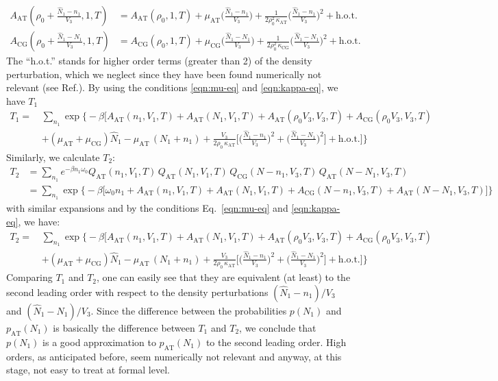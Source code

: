 \documentclass[aip,jcp,a4paper,reprint,onecolumn]{revtex4-1}
\newcommand{\AT}{{\textrm{{AT}}}}
\newcommand{\CG}{{\textrm{CG}}}
\begin{document}
\begin{align}
  A_{\AT}(\rho_0 + \frac{\hat N_1 - n_1}{V_3},1,T)
  &= A_{\AT}(\rho_0,1,T)
  +\mu_{\AT}
  \Big(
  \frac{\hat N_1 - n_1}{V_3}
  \Big)
  +
  \frac1{2\rho_0^2\,\kappa_{\AT}}
  \Big(
  \frac{\hat N_1 - n_1}{V_3}
  \Big)^2
  + \textrm{h.o.t.} \\
  A_{\CG}(\rho_0 + \frac{\hat N_1 - N_1}{V_3},1,T)
  &= A_{\CG}(\rho_0,1,T)
  +\mu_{\CG}
  \Big(
  \frac{\hat N_1 - N_1}{V_3}
  \Big)
  +
  \frac1{2\rho_0^2\,\kappa_{\CG}}
  \Big(
  \frac{\hat N_1 - N_1}{V_3}
  \Big)^2
  + \textrm{h.o.t.} 
\end{align}
The ``h.o.t.'' stands for higher order terms (greater than 2)
of the density perturbation, which we neglect since they have been found numerically not relevant (see Ref.\cite{rdfcorr}).
By using the conditions \eqref{eqn:mu-eq} and \eqref{eqn:kappa-eq},
we have $T_1$
\begin{align}\nonumber
  T_1
  = \,&
  \sum_{n_1}
  \exp
  \Big\{-\beta
  \Big[
  A_{\AT}(n_1,V_1,T) +
  A_{\AT}(N_1,V_1,T) +
  A_{\AT}(\rho_0V_3,V_3,T) +
  A_{\CG}(\rho_0V_3,V_3,T) \\
  \,&+(\mu_\AT + \mu_\CG)\hat N_1
  -\mu_{\AT}\,(N_1 + n_1) +
  \frac{V_3}{2\rho_0\, \kappa_{\AT}}
  \Big[
  \Big(
  \frac{\hat N_1 - n_1}{V_3}
  \Big)^2
  +
  \Big(
  \frac{\hat N_1 - N_1}{V_3}
  \Big)^2
  \Big]
  +\textrm{h.o.t.}
  \Big]
  \Big\}
\end{align}
Similarly, we calculate $T_2$:
\begin{align}\nonumber
  T_2
  &=
  \sum_{n_1}
  e^{-\beta n_1\omega_0}
  Q_{\AT}(n_1,V_1,T)\,
  Q_{\AT}(N_1,V_1,T)\,
  Q_{\CG}(N-n_1,V_3,T)\,
  Q_{\AT}(N-N_1,V_3,T) \\\nonumber
  &=
  \sum_{n_1}
  \exp
  \big\{-\beta
  \big[
  \omega_0n_1 +
  A_{\AT}(n_1,V_1,T) +
  A_{\AT}(N_1,V_1,T) +
  A_{\CG}(N-n_1,V_3,T) +
  A_{\AT}(N-N_1,V_3,T)
  \big]
  \big\}
\end{align}
with similar expansions and by the conditions Eq.~\eqref{eqn:mu-eq}
and \eqref{eqn:kappa-eq}, we have:
\begin{align}\nonumber
  T_2
  = \,&
  \sum_{n_1}
  \exp
  \Big\{-\beta
  \Big[
  A_{\AT}(n_1,V_1,T) +
  A_{\AT}(N_1,V_1,T) +
  A_{\AT}(\rho_0V_3,V_3,T) +
  A_{\CG}(\rho_0V_3,V_3,T) \\
  \,&+(\mu_\AT + \mu_\CG)\hat N_1
  -\mu_{\AT}\,(N_1 + n_1) +
  \frac{V_3}{2\rho_0\, \kappa_{\AT}}
  \Big[
  \Big(
  \frac{\hat N_1 - n_1}{V_3}
  \Big)^2
  +
  \Big(
  \frac{\hat N_1 - N_1}{V_3}
  \Big)^2
  \Big]
  +\textrm{h.o.t.}
  \Big]
  \Big\}
\end{align}
Comparing $T_1$ and $T_2$, one can easily see that they are equivalent (at least) to the second leading
order with respect to the density perturbations
$(\hat N_1 - n_1)/{V_3}$
and $(\hat N_1 - N_1)/{V_3}$.
Since the difference between the probabilities
$p(N_1)$ and $p_{\AT}(N_1)$ is basically the difference between $T_1$
and $T_2$, we conclude that $p(N_1)$ is a good approximation to
$p_{\AT}(N_1)$ to the second leading order. High orders, as anticipated before, seem numerically not relevant and anyway, at this stage, not easy to treat at formal level.
\end{document}
